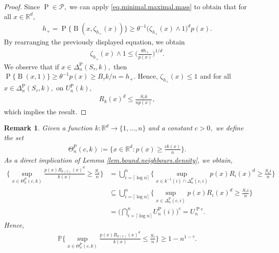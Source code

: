 \documentclass[10pt]{article}
\newcommand{\mP}{\mathcal{P}}
\newcommand{\PP}{\mathbb{P}}
\newcommand{\RR}{\mathbb{R}}
\newcommand{\B}{\operatorname{B}}
\renewcommand{\P}{\operatorname{P}}
\newtheorem{remark}[theorem]{Remark}
\begin{document}
\begin{proof}
    Since $\P \in \mP,$ we can apply \eqref{eq.minimal.maximal.mass} to obtain that for all $x \in \RR^d,$
    \begin{align*}
        h_+ = \P\{\B(x, \zeta_{h_+}(x))\} \geq \theta^{-1}\big(\zeta_{h_+}(x)\wedge 1\big)^dp(x).
    \end{align*}
    By rearranging the previously displayed equation, we obtain
    \begin{align*}
        \zeta_{h_+}(x)\wedge 1 \leq \bigg(\frac{\theta h_+}{p(x)}\bigg)^{1/d}.
    \end{align*}
    We observe that if $x \in \Delta_n^{\P}(S_\tau, k),$ then $\P\{\B(x, 1)\} \geq \theta^{-1}p(x) \geq B_\tau k/n = h_+.$ Hence, $\zeta_{h_+}(x) \leq 1$ and for all $x \in \Delta_n^{\P}(S_\tau, k),$ on $U_n^{\P}(k),$
    \begin{align*}
        R_k(x)^d \leq \frac{S_\tau k}{np(x)},
    \end{align*}
    which implies the result.
\end{proof}

\begin{remark}
    \label{rem.bound.variable.k.density}
    Given a function $k \colon \RR^d \to \{1, \dots, n\}$ and a constant $c>0,$ we define the set
    \begin{align*}
        \Theta_n^{\P}(c, k) := \Bigg\{x \in \RR^d: p(x)\geq \frac{ck(x)}{n}\Bigg\}.
    \end{align*}
    As a direct implication of Lemma \ref{lem.bound.neighbours.density}, we obtain,
    \begin{align*}
        \Bigg\{\sup_{x \in \Theta_n^{\P}(c, k)}\frac{p(x)R_{k(x)}(x)^d}{k(x)} \geq \frac{S_\tau}{n}\Bigg\} &= \bigcup_{i=\lceil\log n\rceil}^n\Bigg\{\sup_{x \in k^{-1}(i)\cap \Delta_n^{\P}(c, i)}p(x)R_i(x)^d \geq \frac{S_\tau i}{n}\Bigg\}\\
        &\subseteq \bigcup_{i=\lceil \log n \rceil}^n\Bigg\{\sup_{x \in \Delta_n^{\P}(c, i)} p(x)R_i(x)^d \geq \frac{S_\tau i}{n}\Bigg\}\\
        &= \bigg(\bigcap_{i=\lceil \log n\rceil}^n U_n^{\P}(i)\bigg)^c = U_n^{\P c}.
    \end{align*}
    Hence,
    \begin{align*}
        \PP\Bigg\{\sup_{x \in \Theta_n^{\P}(c, k)}\frac{p(x)R_{k(x)}(x)^d}{k(x)} \leq \frac{S_\tau}{n}\Bigg\} \geq 1 - n^{1-\tau}.
    \end{align*}
\end{remark}
\end{document}
